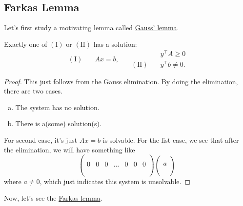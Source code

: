 \subsection{Farkas Lemma}
Let's first study a motivating lemma called \hyperref[lma:Gauss]{Gauss' lemma}.

\begin{lemma}\label{lma:Gauss}
	Exactly one of \((\mathrm{I})\) or \((\mathrm{II})\) has a solution:
	\[
		\begin{aligned}
			(\mathrm{I})\quad & Ax = b,
		\end{aligned}\quad
		\begin{aligned}
			                   & y^{\top}A\geq 0   \\
			(\mathrm{II})\quad & y^{\top}b\neq  0.
		\end{aligned}
	\]
\end{lemma}
\begin{proof}
	This just follows from the Gauss elimination. By doing the elimination, there are two cases.
	\begin{enumerate}[(a)]
		\item The system has no solution.
		\item There is a(some) solution(s).
	\end{enumerate}

	For second case, it's just \(Ax = b\) is solvable.  For the fist case, we see that after the elimination, we will have something like
	\[
		\begin{pmatrix}
			  &   &   &       &   &   &   \\
			  &   &   &       &   &   &   \\
			0 & 0 & 0 & \dots & 0 & 0 & 0 \\
			  &   &   &       &   &   &   \\
			  &   &   &       &   &   &   \\
		\end{pmatrix}
		\begin{pmatrix}
			\\
			\\
			a \\
			\\
			\\
		\end{pmatrix}
	\]
	where \(a\neq 0\), which just indicates this system is unsolvable.
\end{proof}

Now, let's see the \hyperref[lma:Farkas]{Farkas lemma}.

